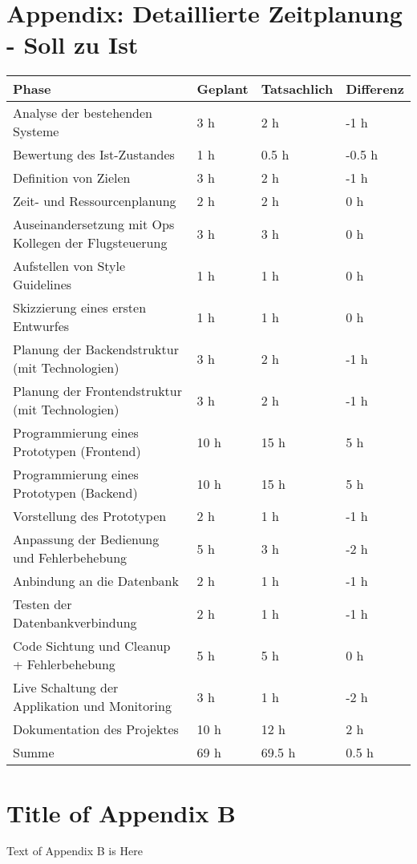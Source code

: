 \appendix
\section{Appendix: Detaillierte Zeitplanung - Soll zu Ist}

\begin{tabular}{llll} \toprule
	Phase & Geplant & Tatsachlich & Differenz\\ \bottomrule
	Analyse der bestehenden Systeme & 3 h & 2 h & -1 h \\
	Bewertung des Ist-Zustandes & 1 h & 0.5 h & -0.5 h \\
	Definition von Zielen & 3 h & 2 h & -1 h \\
	Zeit- und Ressourcenplanung & 2 h & 2 h & 0 h \\
	Auseinandersetzung mit Ops Kollegen der Flugsteuerung & 3 h & 3 h & 0 h \\
	Aufstellen von Style Guidelines & 1 h & 1 h & 0 h \\
	Skizzierung eines ersten Entwurfes & 1 h & 1 h & 0 h \\
	Planung der Backendstruktur (mit Technologien) & 3 h & 2 h & -1 h \\
	Planung der Frontendstruktur (mit Technologien) & 3 h & 2 h & -1 h \\
	Programmierung eines Prototypen (Frontend) & 10 h & 15 h & 5 h \\
	Programmierung eines Prototypen (Backend) & 10 h & 15 h & 5 h \\
	Vorstellung des Prototypen & 2 h & 1 h & -1 h \\
	Anpassung der Bedienung und Fehlerbehebung & 5 h & 3 h & -2 h \\
	Anbindung an die Datenbank & 2 h & 1 h & -1 h \\
	Testen der Datenbankverbindung & 2 h & 1 h & -1 h \\
	Code Sichtung und Cleanup + Fehlerbehebung & 5 h & 5 h & 0 h \\
	Live Schaltung der Applikation und Monitoring & 3 h & 1 h & -2 h \\
	Dokumentation des Projektes & 10 h & 12 h & 2 h \\ \bottomrule

	Summe & 69 h & 69.5 h & 0.5 h \\
\end{tabular}


\section{Title of Appendix B}

Text of Appendix B is Here